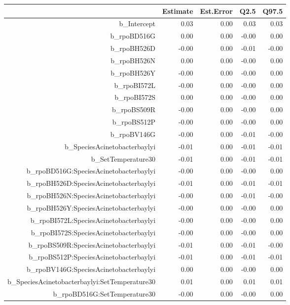 \begin{table}[ht]
\centering
\begin{tabular}{rrrrr}
  \hline
 & Estimate & Est.Error & Q2.5 & Q97.5 \\ 
  \hline
b\_Intercept & 0.03 & 0.00 & 0.03 & 0.03 \\ 
  b\_rpoBD516G & 0.00 & 0.00 & -0.00 & 0.00 \\ 
  b\_rpoBH526D & -0.00 & 0.00 & -0.01 & -0.00 \\ 
  b\_rpoBH526N & 0.00 & 0.00 & -0.00 & 0.00 \\ 
  b\_rpoBH526Y & -0.00 & 0.00 & -0.00 & 0.00 \\ 
  b\_rpoBI572L & -0.00 & 0.00 & -0.00 & 0.00 \\ 
  b\_rpoBI572S & 0.00 & 0.00 & -0.00 & 0.00 \\ 
  b\_rpoBS509R & -0.00 & 0.00 & -0.00 & 0.00 \\ 
  b\_rpoBS512P & -0.00 & 0.00 & -0.00 & 0.00 \\ 
  b\_rpoBV146G & -0.00 & 0.00 & -0.01 & -0.00 \\ 
  b\_SpeciesAcinetobacterbaylyi & -0.01 & 0.00 & -0.01 & -0.01 \\ 
  b\_SetTemperature30 & -0.01 & 0.00 & -0.01 & -0.01 \\ 
  b\_rpoBD516G:SpeciesAcinetobacterbaylyi & -0.00 & 0.00 & -0.00 & 0.00 \\ 
  b\_rpoBH526D:SpeciesAcinetobacterbaylyi & -0.01 & 0.00 & -0.01 & -0.01 \\ 
  b\_rpoBH526N:SpeciesAcinetobacterbaylyi & -0.00 & 0.00 & -0.01 & -0.00 \\ 
  b\_rpoBH526Y:SpeciesAcinetobacterbaylyi & -0.00 & 0.00 & -0.00 & 0.00 \\ 
  b\_rpoBI572L:SpeciesAcinetobacterbaylyi & -0.00 & 0.00 & -0.00 & 0.00 \\ 
  b\_rpoBI572S:SpeciesAcinetobacterbaylyi & -0.00 & 0.00 & -0.00 & 0.00 \\ 
  b\_rpoBS509R:SpeciesAcinetobacterbaylyi & -0.01 & 0.00 & -0.01 & -0.00 \\ 
  b\_rpoBS512P:SpeciesAcinetobacterbaylyi & -0.01 & 0.00 & -0.01 & -0.01 \\ 
  b\_rpoBV146G:SpeciesAcinetobacterbaylyi & 0.00 & 0.00 & -0.00 & 0.00 \\ 
  b\_SpeciesAcinetobacterbaylyi:SetTemperature30 & 0.01 & 0.00 & 0.01 & 0.01 \\ 
  b\_rpoBD516G:SetTemperature30 & -0.00 & 0.00 & -0.00 & 0.00 \\ 

\end{tabular}
\end{table}
